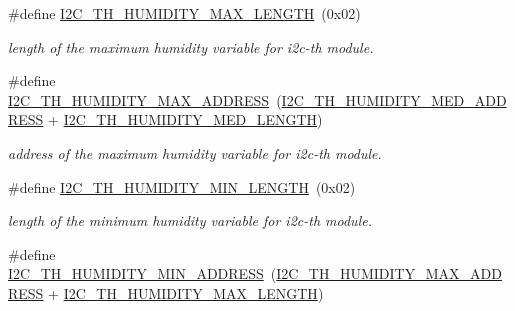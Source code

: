 \begin{DoxyCompactItemize}
\mbox{\label{registers-th_8h_a382c80f1ba03d2f3bc156499d28de9e5}} 
\#define \hyperlink{registers-th_8h_a382c80f1ba03d2f3bc156499d28de9e5}{I2\+C\+\_\+\+T\+H\+\_\+\+H\+U\+M\+I\+D\+I\+T\+Y\+\_\+\+M\+A\+X\+\_\+\+L\+E\+N\+G\+TH}~(0x02)
\begin{DoxyCompactList}\small\item\em length of the maximum humidity variable for i2c-\/th module. \end{DoxyCompactList}\item 
\mbox{\label{registers-th_8h_ad2f26a7b53f478e0dae29960152ae095}} 
\#define \hyperlink{registers-th_8h_ad2f26a7b53f478e0dae29960152ae095}{I2\+C\+\_\+\+T\+H\+\_\+\+H\+U\+M\+I\+D\+I\+T\+Y\+\_\+\+M\+A\+X\+\_\+\+A\+D\+D\+R\+E\+SS}~(\hyperlink{registers-th_8h_a892db1b7b4d94ccdc702a0ef24df6086}{I2\+C\+\_\+\+T\+H\+\_\+\+H\+U\+M\+I\+D\+I\+T\+Y\+\_\+\+M\+E\+D\+\_\+\+A\+D\+D\+R\+E\+SS} + \hyperlink{registers-th_8h_ab8c23d04d8c4c952919ca1c4e414dab6}{I2\+C\+\_\+\+T\+H\+\_\+\+H\+U\+M\+I\+D\+I\+T\+Y\+\_\+\+M\+E\+D\+\_\+\+L\+E\+N\+G\+TH})
\begin{DoxyCompactList}\small\item\em address of the maximum humidity variable for i2c-\/th module. \end{DoxyCompactList}\item 
\mbox{\label{registers-th_8h_a7f9d59a93a51fa58d1fa0fc389a2ff93}} 
\#define \hyperlink{registers-th_8h_a7f9d59a93a51fa58d1fa0fc389a2ff93}{I2\+C\+\_\+\+T\+H\+\_\+\+H\+U\+M\+I\+D\+I\+T\+Y\+\_\+\+M\+I\+N\+\_\+\+L\+E\+N\+G\+TH}~(0x02)
\begin{DoxyCompactList}\small\item\em length of the minimum humidity variable for i2c-\/th module. \end{DoxyCompactList}\item 
\mbox{\label{registers-th_8h_a707f2aa68826eec93b19e8426ab86d02}} 
\#define \hyperlink{registers-th_8h_a707f2aa68826eec93b19e8426ab86d02}{I2\+C\+\_\+\+T\+H\+\_\+\+H\+U\+M\+I\+D\+I\+T\+Y\+\_\+\+M\+I\+N\+\_\+\+A\+D\+D\+R\+E\+SS}~(\hyperlink{registers-th_8h_ad2f26a7b53f478e0dae29960152ae095}{I2\+C\+\_\+\+T\+H\+\_\+\+H\+U\+M\+I\+D\+I\+T\+Y\+\_\+\+M\+A\+X\+\_\+\+A\+D\+D\+R\+E\+SS} + \hyperlink{registers-th_8h_a382c80f1ba03d2f3bc156499d28de9e5}{I2\+C\+\_\+\+T\+H\+\_\+\+H\+U\+M\+I\+D\+I\+T\+Y\+\_\+\+M\+A\+X\+\_\+\+L\+E\+N\+G\+TH})

\end{DoxyCompactItemize}
